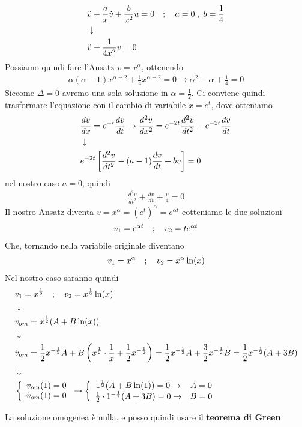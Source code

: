 \begin{align}
	&\ddot{v}  + \frac{a}{x} \dot{v} + \frac{b}{x^2} u = 0 \quad ; \quad a=0 \; , \; b= \frac{1}{4} \\ &\downarrow \nonumber \\
	&	\ddot{v} +\frac{1}{4x^2} v = 0 
\end{align}
Possiamo quindi fare l'Ansatz $v = x^\alpha$, ottenendo
\begin{align}
	\alpha (\alpha -1) x^{\alpha -2} +\frac{1}{4} x^{\alpha -2} = 0 \to \alpha^2 - \alpha + \frac{1}{4} = 0 
\end{align}
Siccome $\Delta = 0$ avremo una sola soluzione in $\alpha = \frac{1}{2}$. Ci conviene quindi trasformare l'equazione con il cambio di variabile $x=e^{t}$, dove otteniamo
\begin{align}
	&\frac{dv}{dx} = e^{-t}\frac{dv}{dt} \to \frac{d^2v}{dx^2} = e^{-2t}\frac{d^2 v}{dt^2} - e^{-2t}\frac{dv}{dt} \\ &\downarrow \nonumber \\
	&e^{-2t} \left[ \frac{d^2 v}{dt^2} - (a-1) \frac{dv}{dt} + bv\right] = 0
\end{align}
nel nostro caso $a=0$, quindi
\begin{align}
	\frac{d^2 v}{dt^2} + \frac{dv}{dt} + \frac{v}{4}= 0
\end{align}
Il nostro  Ansatz diventa $v = x^\alpha = (e^t)^\alpha  = e^{\alpha t}$ eotteniamo le due soluzioni
\begin{align}
	v_1 = e^{\alpha t} \quad ; \quad v_2 = t e^{\alpha t} 
\end{align}
Che, tornando nella variabile originale diventano
\begin{align}
	v_1 = x^\alpha \quad ; \quad v_2 = x^\alpha \ln(x) 
\end{align}
Nel nostro caso saranno quindi
\begin{align}
	&v_1 = x^\frac{1}{2} \quad ; \quad v_2 = x^\frac{1}{2} \ln(x) \\ &\downarrow \nonumber \\
	&v_{om} = x^\frac{1}{2}(A + B\ln(x)) \\ &\downarrow \nonumber \\
	&\dot{v}_{om} = \frac{1}{2}x^{-\frac{1}{2}}A + B \left( x^\frac{1}{2} \cdot \frac{1}{x} + \frac{1}{2}x^{-\frac{1}{2}} \right) = \frac{1}{2}x^{-\frac{1}{2}} A + \frac{3}{2}x^{-\frac{1}{2}} B = \frac{1}{2}x^{-\frac{1}{2}} (A + 3B) \nonumber \\ &\downarrow \nonumber \\
	&\left\{ \begin{array}{cc} v_{om}(1) = 0\\ \dot{v}_{om}(1) = 0 \end{array} \right. \to \left\{ \begin{array}{cc} 1^\frac{1}{2}(A + B\ln(1)) = 0 \to& A = 0\\ \frac{1}{2}\cdot 1^{-\frac{1}{2}} (A + 3B)=0 \to& B = 0 \end{array} \right.
\end{align}

La soluzione omogenea è nulla, e posso quindi usare il \textbf{teorema di Green}.
 
